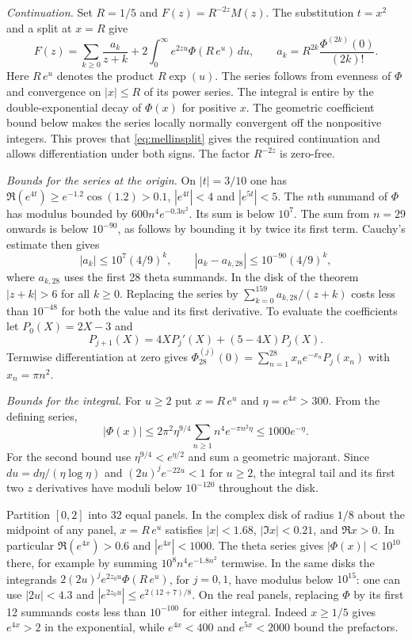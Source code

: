 \documentclass[11pt,a4paper]{article}
\begin{document}
\medskip\noindent
\emph{Continuation.} Set $R=1/5$ and $F(z)=R^{-2z}M(z)$. The substitution
$t=x^2$ and a split at $x=R$ give
\begin{equation}\label{eq:mellinsplit}
 F(z)=\sum_{k\ge0}\frac{a_k}{z+k}
       +2\int_0^\infty e^{2zu}\Phi(R\,e^u)\,du,\qquad
 a_k=R^{2k}\frac{\Phi^{(2k)}(0)}{(2k)!}.
\end{equation}
Here $R\,e^u$ denotes the product $R\exp(u)$. The series follows from
evenness of $\Phi$ and convergence on $|x|\le R$ of its power
series. The integral is entire by the double-exponential decay of
$\Phi(x)$ for positive $x$. The geometric coefficient bound below
makes the series locally normally convergent off the nonpositive
integers. This proves that \eqref{eq:mellinsplit} gives the required
continuation and allows differentiation under both signs.
The factor $R^{-2z}$ is zero-free.

\medskip\noindent
\emph{Bounds for the series at the origin.}
On $|t|=3/10$ one has $\Re(e^{4t})\ge e^{-1.2}\cos(1.2)>0.1$,
$|e^{4t}|<4$ and $|e^{5t}|<5$. The $n$th summand of $\Phi$ has
modulus bounded by $600 n^4 e^{-0.3 n^2}$. Its sum is below $10^7$.
The sum from $n=29$ onwards is below $10^{-90}$, as follows by
bounding it by twice its first term. Cauchy's estimate then gives
\[
 |a_k|\le10^7(4/9)^k,\qquad |a_k-a_{k,28}|\le10^{-90}(4/9)^k,
\]
where $a_{k,28}$ uses the first 28 theta summands. In the disk of the
theorem $|z+k|>6$ for all $k\ge0$. Replacing the series by
$\sum_{k=0}^{159}a_{k,28}/(z+k)$ costs less than $10^{-48}$ for both
the value and its first derivative. To evaluate the coefficients let
$P_0(X)=2X-3$ and
\[
 P_{j+1}(X)=4X P_j'(X)+(5-4X)P_j(X).
\]
Termwise differentiation at zero gives
$\Phi_{28}^{(j)}(0)=\sum_{n=1}^{28} x_n e^{-x_n}P_j(x_n)$ with
$x_n=\pi n^2$.

\medskip\noindent
\emph{Bounds for the integral.}
For $u\ge2$ put $x=R\,e^u$ and $\eta=e^{4x}>300$. From the defining
series,
\[
 |\Phi(x)|\le 2\pi^2\eta^{9/4}
              \sum_{n\ge1}n^4e^{-\pi n^2\eta}
           \le 1000e^{-\eta}.
\]
For the second bound use $\eta^{9/4}<e^{\eta/2}$ and sum a
geometric majorant. Since $du=d\eta/(\eta\log\eta)$ and
$(2u)^j e^{-22u}<1$ for $u\ge2$, the integral tail and its first
two $z$ derivatives have moduli below $10^{-120}$ throughout the disk.

Partition $[0,2]$ into 32 equal panels. In the complex disk of
radius $1/8$ about the midpoint of any panel, $x=R\,e^u$ satisfies
$|x|<1.68$, $|\Im x|<0.21$, and $\Re x>0$. In particular
$\Re(e^{4x})>0.6$ and $|e^{4x}|<1000$. The theta series gives
$|\Phi(x)|<10^{10}$ there, for example by summing
$10^8 n^4e^{-1.8n^2}$ termwise. In the same disks the integrands
$2(2u)^j e^{2z_0u}\Phi(R\,e^u)$, for $j=0,1$, have modulus
below $10^{15}$: one can use $|2u|<4.3$ and
$|e^{2z_0u}|\le e^{2(12+7)/8}$. On the real panels, replacing $\Phi$
by its first 12 summands costs less than $10^{-100}$ for either
integral. Indeed $x\ge 1/5$ gives $e^{4x}>2$ in the exponential,
while $e^{4x}<400$ and $e^{5x}<2000$ bound the prefactors.
\end{document}
